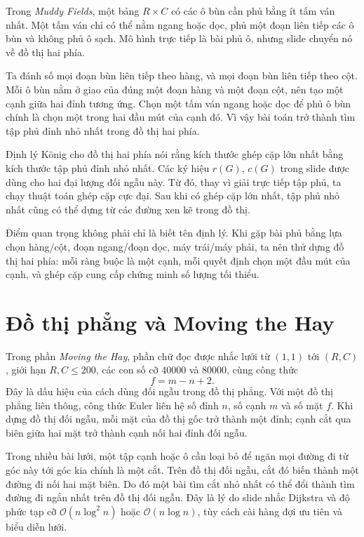 \documentclass[11pt]{article}
\newcommand{\Oh}{\mathcal{O}}
\begin{document}
Trong \textit{Muddy Fields}, một bảng \(R\times C\) có các ô bùn cần phủ bằng
ít tấm ván nhất. Một tấm ván chỉ có thể nằm ngang hoặc dọc, phủ một đoạn liên
tiếp các ô bùn và không phủ ô sạch. Mô hình trực tiếp là bài phủ ô, nhưng
slide chuyển nó về đồ thị hai phía.

Ta đánh số mọi đoạn bùn liên tiếp theo hàng, và mọi đoạn bùn liên tiếp theo
cột. Mỗi ô bùn nằm ở giao của đúng một đoạn hàng và một đoạn cột, nên tạo
một cạnh giữa hai đỉnh tương ứng. Chọn một tấm ván ngang hoặc dọc để phủ ô
bùn chính là chọn một trong hai đầu mút của cạnh đó. Vì vậy bài toán trở
thành tìm tập phủ đỉnh nhỏ nhất trong đồ thị hai phía.

Định lý König cho đồ thị hai phía nói rằng kích thước ghép cặp lớn nhất bằng
kích thước tập phủ đỉnh nhỏ nhất. Các ký hiệu \(r(G)\), \(c(G)\) trong slide
được dùng cho hai đại lượng đối ngẫu này. Từ đó, thay vì giải trực tiếp tập
phủ, ta chạy thuật toán ghép cặp cực đại. Sau khi có ghép cặp lớn nhất, tập
phủ nhỏ nhất cũng có thể dựng từ các đường xen kẽ trong đồ thị.

Điểm quan trọng không phải chỉ là biết tên định lý. Khi gặp bài phủ bằng lựa
chọn hàng/cột, đoạn ngang/đoạn dọc, máy trái/máy phải, ta nên thử dựng đồ thị
hai phía: mỗi ràng buộc là một cạnh, mỗi quyết định chọn một đầu mút của
cạnh, và ghép cặp cung cấp chứng minh số lượng tối thiểu.

\section{Đồ thị phẳng và Moving the Hay}

Trong phần \textit{Moving the Hay}, phần chữ đọc được nhắc lưới từ \((1,1)\)
tới \((R,C)\), giới hạn \(R,C\le 200\), các con số cỡ \(40000\) và \(80000\),
cùng công thức
\[
  f=m-n+2.
\]
Đây là dấu hiệu của cách dùng đối ngẫu trong đồ thị phẳng. Với một đồ thị
phẳng liên thông, công thức Euler liên hệ số đỉnh \(n\), số cạnh \(m\) và số
mặt \(f\). Khi dựng đồ thị đối ngẫu, mỗi mặt của đồ thị gốc trở thành một
đỉnh; cạnh cắt qua biên giữa hai mặt trở thành cạnh nối hai đỉnh đối ngẫu.

Trong nhiều bài lưới, một tập cạnh hoặc ô cần loại bỏ để ngăn mọi đường đi từ
góc này tới góc kia chính là một cắt. Trên đồ thị đối ngẫu, cắt đó biến thành
một đường đi nối hai mặt biên. Do đó một bài tìm cắt nhỏ nhất có thể đổi
thành tìm đường đi ngắn nhất trên đồ thị đối ngẫu. Đây là lý do slide nhắc
Dijkstra và độ phức tạp cỡ \(\Oh(n\log^2 n)\) hoặc \(\Oh(n\log n)\), tùy cách
cài hàng đợi ưu tiên và biểu diễn lưới.
\end{document}
